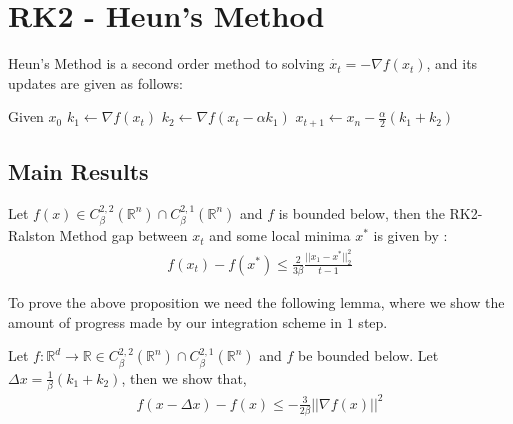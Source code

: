 \section{RK2 - Heun's Method}
Heun's Method is a second order method to solving $\dot{x_t} = - \nabla f(x_t)$, and its updates are given as follows:
\begin{algorithmic}
\STATE Given $x_0$
  \STATE $k_1 \gets \nabla f(x_t)$
  \STATE $k_2 \gets \nabla f(x_t - \alpha k_1) $
  \STATE $x_{t+1} \gets x_n - \frac{\alpha}{2}(k_1 + k_2)$
\ENDFOR
\end{algorithmic}
\subsection{Main Results}
\begin{thm} Let $f(x) \in C_{\beta}^{2,2}( \mathbb{R}^n) \cap  C_{\beta}^{2,1}( \mathbb{R}^n)$ and $f$ is bounded below, then the RK2-Ralston Method gap between $x_t$ and some local minima $x^*$ is given by :
\begin{align*}
f(x_t) - f(x^*) \leq \frac{2}{3 \beta} \frac{ || x_1 - x^* ||_2^2}{t-1}
\end{align*}
\end{thm}
To prove the above proposition we need the following lemma, where we show the amount of progress made by our integration scheme in $1$ step.
\begin{lemma}
Let $f : \mathbb{R}^d \rightarrow \mathbb{R} \in C_{\beta}^{2,2}( \mathbb{R}^n) \cap  C_{\beta}^{2,1}( \mathbb{R}^n) $  and $f$ be bounded below. Let $\Delta x =  \frac{1}{\beta}(k_1 + k_2)$, then  we show that,
\begin{align}
f(x - \Delta x ) - f(x) \leq - \frac{3}{2 \beta} || \nabla f(x) ||^2
\end{align}
\end{lemma}

